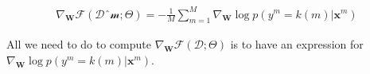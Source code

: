 
\begin{align}
\nabla_\mathbf{W}\mathcal{F}(\mathcal{Dˆm};\Theta) = - \frac{1}{M} \sum_{m=1}^M \nabla_\mathbf{W} \log p(y^m=k(m) | \mathbf{x}^m)
\label{eq:GradientCostDecomposition}
\end{align}

All we need to do to compute $\nabla_\mathbf{W}\mathcal{F}(\mathcal{D};\Theta)$  is to have an expression for $\nabla_\mathbf{W} \log p(y^m=k(m) | \mathbf{x}^m)$.


